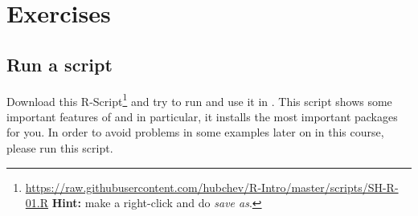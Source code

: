\chapter{Exercises}








\section{Run a script}\label{exe:runascript}

Download this R-Script\footnote{\websmall\url{https://raw.githubusercontent.com/hubchev/R-Intro/master/scripts/SH-R-01.R} \textbf{Hint:} make a right-click and do \textit{save as}.} and try to run and use it in \Rstudio. This script shows some important features of \R and in particular, it installs the most important packages for you. In order to avoid problems in some examples later on in this course, please run this script.


